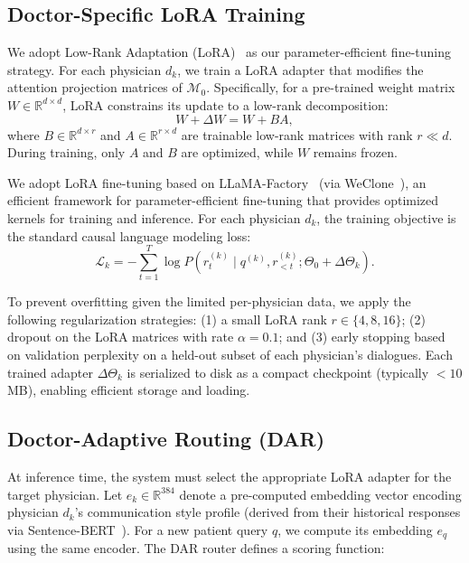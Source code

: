 \subsection{Doctor-Specific LoRA Training}

We adopt Low-Rank Adaptation (LoRA)~\cite{hu2021lora} as our parameter-efficient fine-tuning strategy. For each physician $d_k$, we train a LoRA adapter that modifies the attention projection matrices of $\mathcal{M}_0$. Specifically, for a pre-trained weight matrix $W \in \mathbb{R}^{d \times d}$, LoRA constrains its update to a low-rank decomposition:
\begin{equation}
W + \Delta W = W + B A,
\end{equation}
where $B \in \mathbb{R}^{d \times r}$ and $A \in \mathbb{R}^{r \times d}$ are trainable low-rank matrices with rank $r \ll d$. During training, only $A$ and $B$ are optimized, while $W$ remains frozen.

We adopt LoRA fine-tuning based on LLaMA-Factory~\cite{zheng2024llamafactory} (via WeClone~\cite{xmingXming521WeClone2026}), an efficient framework for parameter-efficient fine-tuning that provides optimized kernels for training and inference. For each physician $d_k$, the training objective is the standard causal language modeling loss:
\begin{equation}
\mathcal{L}_k = -\sum_{t=1}^{T} \log P(r_t^{(k)} \mid q^{(k)}, r_{<t}^{(k)}; \Theta_0 + \Delta \Theta_k).
\end{equation}

To prevent overfitting given the limited per-physician data, we apply the following regularization strategies: (1) a small LoRA rank $r \in \{4, 8, 16\}$; (2) dropout on the LoRA matrices with rate $\alpha = 0.1$; and (3) early stopping based on validation perplexity on a held-out subset of each physician's dialogues. Each trained adapter $\Delta \Theta_k$ is serialized to disk as a compact checkpoint (typically $<10$ MB), enabling efficient storage and loading.

\subsection{Doctor-Adaptive Routing (DAR)}

At inference time, the system must select the appropriate LoRA adapter for the target physician. Let $e_k \in \mathbb{R}^{384}$ denote a pre-computed embedding vector encoding physician $d_k$'s communication style profile (derived from their historical responses via Sentence-BERT~\cite{reimers2019sentence}). For a new patient query $q$, we compute its embedding $e_q$ using the same encoder. The DAR router defines a scoring function:

